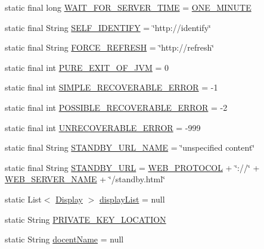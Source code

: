 \begin{DoxyCompactItemize}
\item 
static final long \hyperlink{classgov_1_1fnal_1_1ppd_1_1dd_1_1GlobalVariables_a7ffc604df353f97f39c5c9734c45fb38}{W\-A\-I\-T\-\_\-\-F\-O\-R\-\_\-\-S\-E\-R\-V\-E\-R\-\_\-\-T\-I\-M\-E} = \hyperlink{classgov_1_1fnal_1_1ppd_1_1dd_1_1GlobalVariables_a79fc1e35198b44168537a85aa4c2d942}{O\-N\-E\-\_\-\-M\-I\-N\-U\-T\-E}
\item 
static final String \hyperlink{classgov_1_1fnal_1_1ppd_1_1dd_1_1GlobalVariables_aaaf6fe49f89ce39ddba1fac773161acf}{S\-E\-L\-F\-\_\-\-I\-D\-E\-N\-T\-I\-F\-Y} = \char`\"{}http\-://identify\char`\"{}
\item 
static final String \hyperlink{classgov_1_1fnal_1_1ppd_1_1dd_1_1GlobalVariables_a79c44481889ff937b51e30d13d9c1c35}{F\-O\-R\-C\-E\-\_\-\-R\-E\-F\-R\-E\-S\-H} = \char`\"{}http\-://refresh\char`\"{}
\item 
static final int \hyperlink{classgov_1_1fnal_1_1ppd_1_1dd_1_1GlobalVariables_a9a5a3b99227fe4929fc0c3c664a922da}{P\-U\-R\-E\-\_\-\-E\-X\-I\-T\-\_\-\-O\-F\-\_\-\-J\-V\-M} = 0
\item 
static final int \hyperlink{classgov_1_1fnal_1_1ppd_1_1dd_1_1GlobalVariables_aa1eece63cce68ac0186379fc2fa2272a}{S\-I\-M\-P\-L\-E\-\_\-\-R\-E\-C\-O\-V\-E\-R\-A\-B\-L\-E\-\_\-\-E\-R\-R\-O\-R} = -\/1
\item 
static final int \hyperlink{classgov_1_1fnal_1_1ppd_1_1dd_1_1GlobalVariables_a9e5673ef7b6da85febe9775aebc9504c}{P\-O\-S\-S\-I\-B\-L\-E\-\_\-\-R\-E\-C\-O\-V\-E\-R\-A\-B\-L\-E\-\_\-\-E\-R\-R\-O\-R} = -\/2
\item 
static final int \hyperlink{classgov_1_1fnal_1_1ppd_1_1dd_1_1GlobalVariables_af2d69bd16e463355307ead1135160408}{U\-N\-R\-E\-C\-O\-V\-E\-R\-A\-B\-L\-E\-\_\-\-E\-R\-R\-O\-R} = -\/999
\item 
static final String \hyperlink{classgov_1_1fnal_1_1ppd_1_1dd_1_1GlobalVariables_a95b7cd98e8cf8f461bff828889a3e6f0}{S\-T\-A\-N\-D\-B\-Y\-\_\-\-U\-R\-L\-\_\-\-N\-A\-M\-E} = \char`\"{}unspecified content\char`\"{}
\item 
static final String \hyperlink{classgov_1_1fnal_1_1ppd_1_1dd_1_1GlobalVariables_a7519a50604167fa9cf1c9e51cd4a6267}{S\-T\-A\-N\-D\-B\-Y\-\_\-\-U\-R\-L} = \hyperlink{classgov_1_1fnal_1_1ppd_1_1dd_1_1GlobalVariables_aa3bf05d555f0c3489c60664ae54a2480}{W\-E\-B\-\_\-\-P\-R\-O\-T\-O\-C\-O\-L} + \char`\"{}\-://\char`\"{} + \hyperlink{classgov_1_1fnal_1_1ppd_1_1dd_1_1GlobalVariables_af5ffb15826513fabba402ec017edbc70}{W\-E\-B\-\_\-\-S\-E\-R\-V\-E\-R\-\_\-\-N\-A\-M\-E} + \char`\"{}/standby.\-html\char`\"{}
\item 
static List$<$ \hyperlink{interfacegov_1_1fnal_1_1ppd_1_1dd_1_1signage_1_1Display}{Display} $>$ \hyperlink{classgov_1_1fnal_1_1ppd_1_1dd_1_1GlobalVariables_a30efdc2ab60dd04f76dc1210b8447426}{display\-List} = null
\item 
static String \hyperlink{classgov_1_1fnal_1_1ppd_1_1dd_1_1GlobalVariables_aa26c21d05850efb85c8f5517d8258e5d}{P\-R\-I\-V\-A\-T\-E\-\_\-\-K\-E\-Y\-\_\-\-L\-O\-C\-A\-T\-I\-O\-N}
\item 
static String \hyperlink{classgov_1_1fnal_1_1ppd_1_1dd_1_1GlobalVariables_a1a8699e7b2ec1e9cad652869fedafa2b}{docent\-Name} = null
\end{DoxyCompactItemize}


